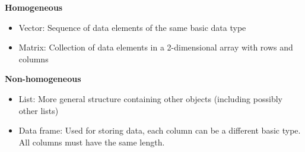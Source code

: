\noindent\textbf{Homogeneous}

\begin{itemize}
    \item Vector: Sequence of data elements of the same basic data type
    \item Matrix: Collection of data elements in a 2-dimensional array with rows and columns
\end{itemize}

\noindent\textbf{Non-homogeneous}

\begin{itemize}
    \item List: More general structure containing other objects (including possibly other lists)
    \item Data frame: Used for storing data, each column can be a different basic type. All columns must have the same length.
\end{itemize}



